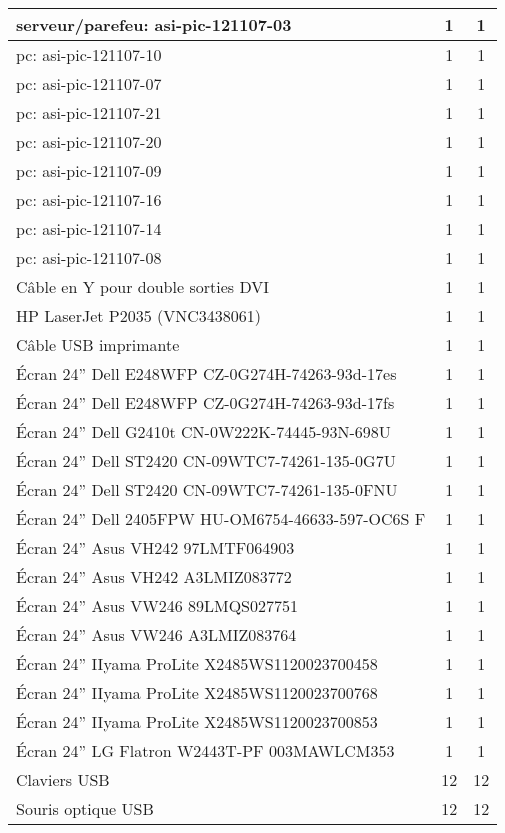 \begin{center}
\begin{longtable}{|p{10cm}|c|c|}
\hline \hline
\endlastfoot
		\hline serveur/parefeu: asi-pic-121107-03  & 1 & 1 \\
		\hline pc: asi-pic-121107-10 & 1 & 1 \\
		\hline pc: asi-pic-121107-07 & 1 & 1 \\
		\hline pc: asi-pic-121107-21 & 1 & 1 \\
		\hline pc: asi-pic-121107-20 & 1 & 1 \\
		\hline pc: asi-pic-121107-09 & 1 & 1 \\
		\hline pc: asi-pic-121107-16 & 1 & 1 \\
		\hline pc: asi-pic-121107-14 & 1 & 1 \\
		\hline pc: asi-pic-121107-08 & 1 & 1 \\
		\hline Câble en Y pour double sorties DVI & 1 & 1 \\ 
		\hline HP LaserJet P2035 (VNC3438061)& 1 & 1 \\ 
		\hline Câble USB imprimante & 1 & 1 \\ 
		\hline Écran 24” Dell E248WFP CZ-0G274H-74263-93d-17es & 1 & 1 \\ 
		\hline Écran 24” Dell E248WFP CZ-0G274H-74263-93d-17fs & 1 & 1 \\ 
		\hline Écran 24” Dell G2410t CN-0W222K-74445-93N-698U & 1 & 1 \\ 
		\hline Écran 24” Dell ST2420 CN-09WTC7-74261-135-0G7U & 1 & 1 \\ 
		\hline Écran 24” Dell ST2420 CN-09WTC7-74261-135-0FNU & 1 & 1 \\ 
		\hline Écran 24” Dell 2405FPW HU-OM6754-46633-597-OC6S F  & 1 & 1 \\ 
		\hline Écran 24” Asus VH242 97LMTF064903 & 1 & 1 \\ 
		\hline Écran 24” Asus VH242 A3LMIZ083772 & 1 & 1 \\ 
		\hline Écran 24” Asus VW246 89LMQS027751 & 1 & 1 \\
		\hline Écran 24” Asus VW246 A3LMIZ083764 & 1 & 1 \\	
		\hline Écran 24” IIyama ProLite X2485WS1120023700458 & 1 & 1 \\ 
		\hline Écran 24” IIyama ProLite X2485WS1120023700768 & 1 & 1 \\
		\hline Écran 24” IIyama ProLite X2485WS1120023700853 & 1 & 1 \\
		\hline Écran 24” LG Flatron W2443T-PF 003MAWLCM353 & 1 & 1 \\
		\hline Claviers USB & 12 & 12 \\ 
		\hline Souris optique USB & 12 & 12 \\ 

\end{longtable}
\end{center}
